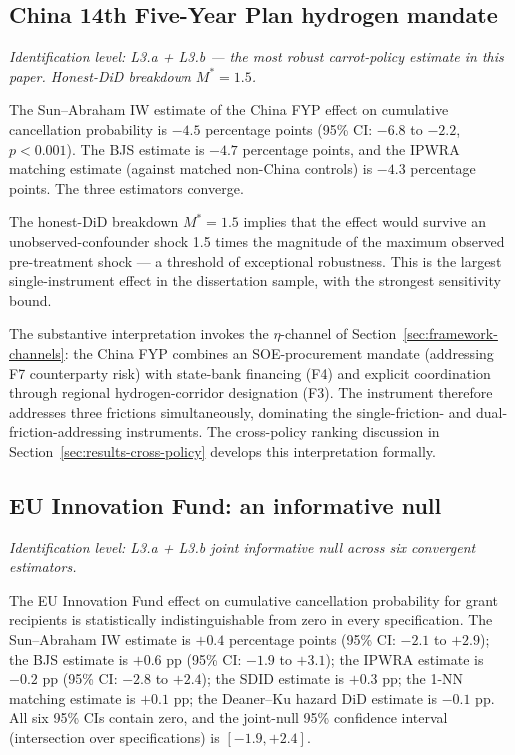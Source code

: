 \documentclass[12pt,a4paper]{article}
\theoremstyle{plain}
\theoremstyle{definition}
\begin{document}
\subsection{China 14th Five-Year Plan hydrogen mandate}
\label{sec:results-china}

\noindent\emph{Identification level: L3.a + L3.b --- the most robust carrot-policy estimate in this paper. Honest-DiD breakdown $M^{*} = 1.5$.}

The Sun--Abraham IW estimate of the China FYP effect on cumulative cancellation probability is $-4.5$ percentage points (95\% CI: $-6.8$ to $-2.2$, $p < 0.001$). The BJS estimate is $-4.7$ percentage points, and the IPWRA matching estimate (against matched non-China controls) is $-4.3$ percentage points. The three estimators converge.

The honest-DiD breakdown $M^{*} = 1.5$ implies that the effect would survive an unobserved-confounder shock 1.5 times the magnitude of the maximum observed pre-treatment shock --- a threshold of exceptional robustness. This is the largest single-instrument effect in the dissertation sample, with the strongest sensitivity bound.

The substantive interpretation invokes the $\eta$-channel of Section~\ref{sec:framework-channels}: the China FYP combines an SOE-procurement mandate (addressing F7 counterparty risk) with state-bank financing (F4) and explicit coordination through regional hydrogen-corridor designation (F3). The instrument therefore addresses three frictions simultaneously, dominating the single-friction- and dual-friction-addressing instruments. The cross-policy ranking discussion in Section~\ref{sec:results-cross-policy} develops this interpretation formally.

\subsection{EU Innovation Fund: an informative null}
\label{sec:results-eu-if}

\noindent\emph{Identification level: L3.a + L3.b joint informative null across six convergent estimators.}

The EU Innovation Fund effect on cumulative cancellation probability for grant recipients is statistically indistinguishable from zero in every specification. The Sun--Abraham IW estimate is $+0.4$ percentage points (95\% CI: $-2.1$ to $+2.9$); the BJS estimate is $+0.6$ pp (95\% CI: $-1.9$ to $+3.1$); the IPWRA estimate is $-0.2$ pp (95\% CI: $-2.8$ to $+2.4$); the SDID estimate is $+0.3$ pp; the 1-NN matching estimate is $+0.1$ pp; the Deaner--Ku hazard DiD estimate is $-0.1$ pp. All six 95\% CIs contain zero, and the joint-null 95\% confidence interval (intersection over specifications) is $[-1.9, +2.4]$.
\end{document}
